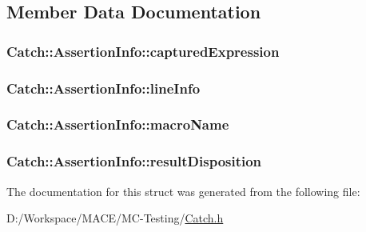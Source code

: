 \subsection{Member Data Documentation}
\subsubsection[{\texorpdfstring{captured\+Expression}{capturedExpression}}]{ Catch\+::\+Assertion\+Info\+::captured\+Expression}\hypertarget{struct_catch_1_1_assertion_info_af7c1d3cbfa346e9a303030fa0ef0cb54}{}\label{struct_catch_1_1_assertion_info_af7c1d3cbfa346e9a303030fa0ef0cb54}
\subsubsection[{\texorpdfstring{line\+Info}{lineInfo}}]{ Catch\+::\+Assertion\+Info\+::line\+Info}\hypertarget{struct_catch_1_1_assertion_info_a17bdbb404ba12658034f833be2f4c3e7}{}\label{struct_catch_1_1_assertion_info_a17bdbb404ba12658034f833be2f4c3e7}
\subsubsection[{\texorpdfstring{macro\+Name}{macroName}}]{ Catch\+::\+Assertion\+Info\+::macro\+Name}\hypertarget{struct_catch_1_1_assertion_info_ac2e59e8c89e00eb3390768f50d540b18}{}\label{struct_catch_1_1_assertion_info_ac2e59e8c89e00eb3390768f50d540b18}
\subsubsection[{\texorpdfstring{result\+Disposition}{resultDisposition}}]{ Catch\+::\+Assertion\+Info\+::result\+Disposition}\hypertarget{struct_catch_1_1_assertion_info_a60353b3632ab2f827162f2b2d6911073}{}\label{struct_catch_1_1_assertion_info_a60353b3632ab2f827162f2b2d6911073}


The documentation for this struct was generated from the following file\+:\begin{DoxyCompactItemize}
\item 
D\+:/\+Workspace/\+M\+A\+C\+E/\+M\+C-\/\+Testing/\hyperlink{_catch_8h}{Catch.\+h}\end{DoxyCompactItemize}
